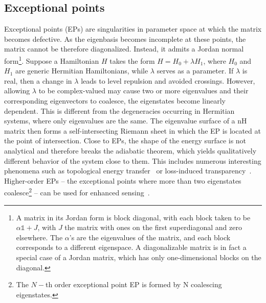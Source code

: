 \subsection{Exceptional points}
Exceptional points (EPs) are singularities in parameter space at which the matrix becomes defective. As the eigenbasis becomes incomplete at these points, the matrix cannot be therefore diagonalized. Instead, it admits a Jordan normal form\footnote{A matrix in its Jordan form is block diagonal, with each block taken to be $\alpha \mathbb{1} + J$, with $J$ the matrix with ones on the first superdiagonal and zero elsewhere. The $\alpha$'s are the eigenvalues of the matrix, and each block corresponds to a different eigenspace. A diagonalizable matrix is in fact a special case of a Jordan matrix, which has only one-dimensional blocks on the diagonal.}. Suppose a Hamiltonian $H$ takes the form $H = H_0 + \lambda H_1$, where $H_0$ and $H_1$ are generic Hermitian Hamiltonians, while $\lambda$ serves as a parameter. If $\lambda$ is real, then a change in $\lambda$ leads to level repulsion and avoided crossings. However, allowing $\lambda$ to be complex-valued may cause two or more eigenvalues and their corresponding eigenvectors to coalesce, \ie the eigenstates become linearly dependent. This is different from the degeneracies occurring in Hermitian systems, where only eigenvalues are the same. The eigenvalue surface of a nH matrix then forms a self-intersecting Riemann sheet in which the EP is located at the point of intersection. Close to EPs, the shape of the energy surface is not analytical and therefore breaks the adiabatic theorem, which yields qualitatively different behavior of the system close to them. This includes numerous interesting phenomena such as topological energy transfer~\cite{Xu2016} or loss-induced transparency~\cite{PhysRevLett.103.093902}. Higher-order EPs -- the exceptional points where more than two eigenstates coalesce\footnote{The $N-$th order exceptional point EP is formed by N coalescing eigenstates.}  -- can be used for enhanced sensing~\cite{Hodaei2017}.

